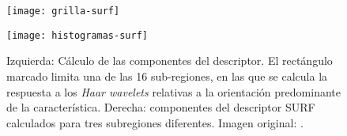 \begin{subsection}
\begin{subsection}
\begin{figure}[ht]
\centering
\begin{minipage}[h]{.45\textwidth}
\begin{center}
\texttt{[image: grilla-surf]}
\end{center}
\end{minipage}
\hfill
\begin{minipage}[h]{.45\textwidth}
\begin{center}
\texttt{[image: histogramas-surf]}
\end{center}
\end{minipage}
\hfill
\caption[Componentes del descriptor SURF]
{Izquierda: Cálculo de las componentes del descriptor. El rectángulo marcado limita una de las 16 sub-regiones, en las que se calcula la respuesta a los \textit{Haar wavelets} relativas a la orientación predominante de la característica. Derecha: componentes del descriptor SURF calculados para tres subregiones diferentes. Imagen original: \cite{bay2008speeded}.}
\label{fig:componentes-descriptor-surf}
\end{figure}

\end{subsection}

\end{subsection}

